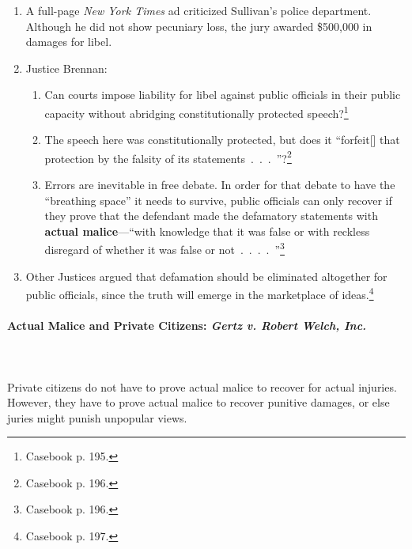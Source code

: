 \begin{enumerate}
    \item A full-page \emph{New York Times} ad criticized Sullivan's police 
    department. Although he did not show pecuniary loss, the jury awarded 
    \$500,000 in damages for libel.
    \item Justice Brennan:
    \begin{enumerate}
        \item Can courts impose liability for libel against public officials in 
        their public capacity without abridging constitutionally protected 
        speech?\footnote{Casebook p. 195.}
        \item The speech here was constitutionally protected, but does it 
        ``forfeit[] that protection by the falsity of its 
        statements~.~.~.~''?\footnote{Casebook p. 196.}
        \item Errors are inevitable in free debate. In order for that debate to 
        have the ``breathing space'' it needs to survive, public officials can 
        only recover if they prove that the defendant made the defamatory 
        statements with \textbf{actual malice}---``with knowledge that it was 
        false or with reckless disregard of whether it was false or 
        not~.~.~.~.~''\footnote{Casebook p. 196.}
    \end{enumerate}
    \item Other Justices argued that defamation should be eliminated altogether 
    for public officials, since the truth will emerge in the marketplace of 
    ideas.\footnote{Casebook p. 197.}
\end{enumerate}

\paragraph{Actual Malice and Private Citizens: \emph{Gertz v. Robert Welch, 
Inc.}}
~\\\\
Private citizens do not have to prove actual malice to recover for actual 
injuries. However, they have to prove actual malice to recover punitive damages, 
or else juries might punish unpopular views.

